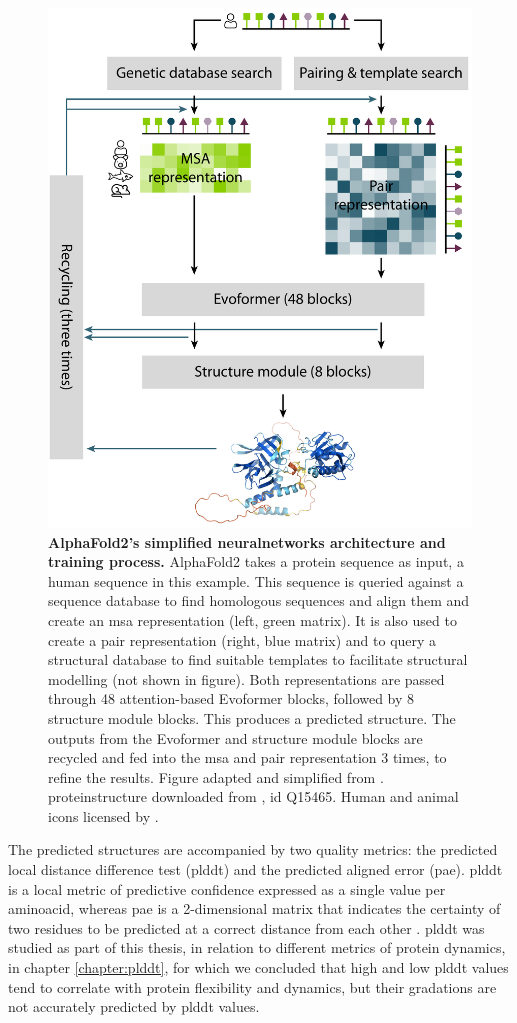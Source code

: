 \begin{figure}[H]
    \centering
    \includegraphics[width=0.75\linewidth]{figures/af2_architecture_simple.pdf}
    \caption{\textbf{AlphaFold2's simplified \gls{neuralnetworks} architecture and training process.} AlphaFold2 takes a protein sequence as input, a human sequence in this example. This sequence is queried against a sequence database to find homologous sequences and align them and create an \gls{msa} representation (left, green matrix). It is also used to create a pair representation (right, blue matrix) and to query a structural database to find suitable templates to facilitate structural modelling (not shown in figure). Both representations are passed through 48 \gls{attention}-based Evoformer blocks, followed by 8 structure module blocks. This produces a predicted structure. The outputs from the Evoformer and structure module blocks are recycled and fed into the \gls{msa} and pair representation 3 times, to refine the results. Figure adapted and simplified from \cite{jumper_highly_2021}. \gls{proteinstructure} downloaded from , id Q15465. Human and animal icons licensed by .}
    \label{fig:chapter1:af2_structure}
\end{figure}

The predicted structures are accompanied by two quality metrics: the predicted local distance difference test (\gls{plddt}) and the predicted aligned error (\gls{pae}). \gls{plddt} is a local metric of predictive confidence expressed as a single value per \gls{aminoacid}, whereas \gls{pae} is a 2-dimensional matrix that indicates the certainty of two residues to be predicted at a correct distance from each other \cite{jumper_highly_2021}. \gls{plddt} was studied as part of this thesis, in relation to different metrics of protein \gls{dynamics}, in chapter \ref{chapter:plddt}, for which we concluded that high and low \gls{plddt} values tend to correlate with protein \gls{flexibility} and \gls{dynamics}, but their gradations are not accurately predicted by \gls{plddt} values. 

